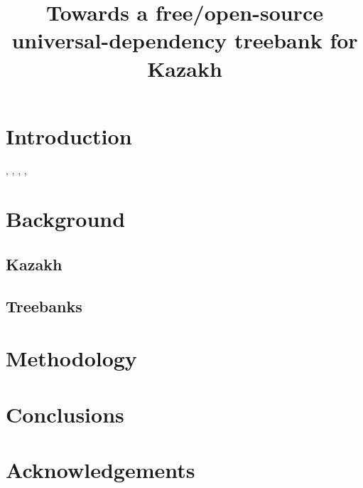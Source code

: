 \documentclass[a4paper,11pt, onecolumn]{article}
\title{Towards a free/open-source universal-dependency treebank for Kazakh}
\begin{document}
\maketitleabstract{}


\section{Introduction}

\citet{Lynn12}, \citet{Atalay03}, \citet{Oflazer03}, \citet{Washington14}, \citet{DeMarneffe14}

\section{Background}

\subsection{Kazakh}

\subsection{Treebanks} %

\section{Methodology}

\section{Conclusions}

\section*{Acknowledgements}



\end{document}

